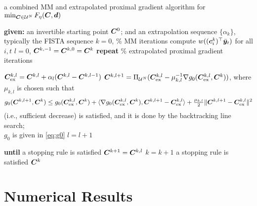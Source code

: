 \documentclass[10pt,twocolumn,twoside]{IEEEtran}
\begin{document}
\begin{algorithm}[hbt]
	\caption{a combined MM and extrapolated proximal gradient algorithm for $\min_{{\bm C} \in \mathcal{U}^N} F_\eta({\bm C},{\bm d})$} \label{alg:prsisal_C}
	\begin{algorithmic}[1]
		\STATE \textbf{given:} an invertible starting point ${\bm C}^0$;  and an extrapolation sequence $\{ \alpha_k \}$, typically the FISTA sequence \cite{beck2017first}
		\STATE $k= 0$,
		 \hspace{1em} \% MM iterations
		\STATE \hspace{1em} compute $w( ({\bm c}_i^k)^\top \bar{{\bm y}}_t )$ for all $i,t$
		\STATE \hspace{1em} $l= 0$, ${\bm C}^{k,-1} = {\bm C}^{k,0} = {\bm C}^k$
		\STATE \hspace{1em} {\bf repeat} \hspace{1em} \% extrapolated proximal gradient iterations
		
		\STATE \hspace{2em} ${\bm C}_{\rm ex}^{k,l} = {\bm C}^{k,l} + \alpha_l ( {\bm C}^{k,l} - {\bm C}^{k,l-1} )$
		\STATE \hspace{2em} ${\bm C}^{k,l+1} = \Pi_{\mathcal{U}^N}( {\bm C}_{\rm ex}^{k,l} - \mu_{k,l}^{-1} \nabla g_0( {\bm C}_{\rm ex}^{k,l}, {\bm C}^k ))$, where $\mu_{k,l}$ is chosen such that
		\[ g_0({\bm C}^{k,l+1},{\bm C}^k ) \leq g_0({\bm C}_{\rm ex}^{k,l},{\bm C}^k ) + \langle \nabla g_0({\bm C}_{\rm ex}^{k,l},{\bm C}^k ), {\bm C}^{k,l+1} - {\bm C}_{\rm ex}^{k,l} \rangle + \tfrac{\mu_{k,l}}{2} \| {\bm C}^{k,l+1} - {\bm C}_{\rm ex}^{k,l} \|^2 \]
		\hspace{2em} (i.e., sufficient decrease)	is satisfied, and it is done by the backtracking line search; \\
		\hspace{2em}  $g_0$  is given in \eqref{eq:g0}
		\STATE \hspace{2em} $l= l+1$
		
		
		\STATE \hspace{1em} {\bf until} a stopping rule is satisfied
		\STATE \hspace{1em} ${\bm C}^{k+1} = {\bm C}^{k,l}$
		\STATE \hspace{1em} $k= k+1$
		 a stopping rule is satisfied
		 ${\bm C}^k$
	\end{algorithmic}
\end{algorithm}


\section{Numerical Results}
\end{document}
